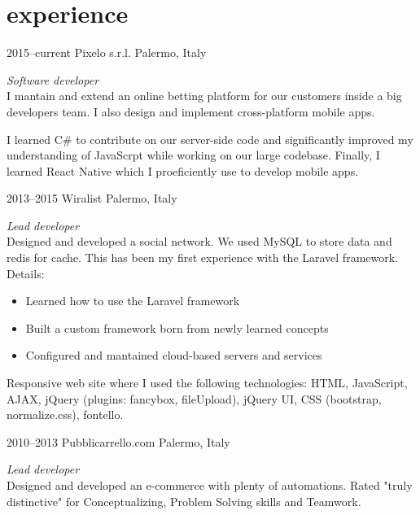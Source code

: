 \documentclass[]{friggeri-cv} %
\begin{document}
\section{experience}
\begin{entrylist}
\entry
{2015--current}
{Pixelo s.r.l.}
{Palermo, Italy}
{\emph{Software developer} \\
I mantain and extend an online betting platform for our customers inside a big
developers team. I also design and implement cross-platform mobile apps.

I learned C\# to contribute on our server-side code and significantly improved
my understanding of JavaScrpt while working on our large codebase. Finally, I
learned React Native which I proeficiently use to develop mobile apps.
}
\entry
{2013--2015}
{Wiralist}
{Palermo, Italy}
{\emph{Lead developer} \\
Designed and developed a social network. We used MySQL to store data and redis for cache. This has been my first experience with the Laravel framework. \\
Details:
\begin{itemize}
\item Learned how to use the Laravel framework
\item Built a custom framework born from newly learned concepts
\item Configured and mantained cloud-based servers and services
\end{itemize}

Responsive web site where I used the following technologies: HTML,
JavaScript, AJAX, jQuery (plugins: fancybox, fileUpload), jQuery UI,
CSS (bootstrap, normalize.css), fontello.
}
\entry
{2010--2013}
{Pubblicarrello.com}
{Palermo, Italy}
{\emph{Lead developer} \\
Designed and developed an e-commerce with plenty of automations. Rated "truly distinctive"
for Conceptualizing, Problem Solving skills and Teamwork.

}
\end{entrylist}
\end{document}
